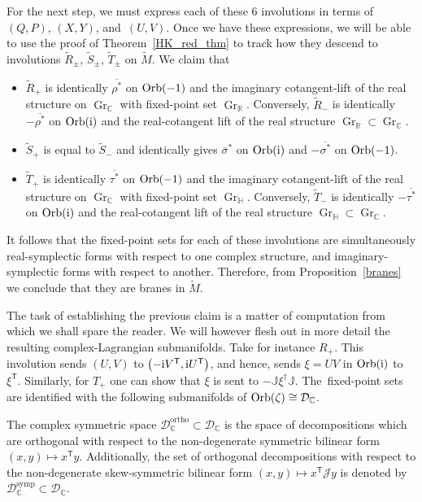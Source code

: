 \documentclass[pdftex]{sigma}
\numberwithin{equation}{section}
\DeclareMathOperator{\Gr}{Gr}
\newcommand{\R}{\mathbb{R}}
\newcommand{\C}{\mathbb{C}}
\newcommand{\D}{\mathcal{D}}
\newcommand{\Q}{\mathbb{H}}
\begin{document}
For the next step, we must express each of these 6 involutions in terms of $(Q,P)$, $(X,Y)$, and~$(U,V)$. Once we have these expressions, we will be able to use the proof of Theorem~\ref{HK_red_thm} to track how they descend to involutions $\widetilde{R}_\pm$, $\widetilde{S}_\pm$, $\widetilde{T}_\pm$ on $\tilde{M}$. We claim that
\begin{itemize}\itemsep=0pt
	\item $\widetilde{R}_+$ is identically $\overline{\rho^*}$ on ${\rm Orb}(-1)$ and the imaginary cotangent-lift of the real structure on $\Gr_\C$ with fixed-point set $\Gr_\R$. Conversely, $\widetilde{R}_-$ is identically $-\overline{\rho^*}$ on ${\rm Orb}({\rm i})$ and the real-cotangent lift of the real structure $\Gr_\R\subset\Gr_\C$.
	\item $\widetilde{S}_+$ is equal to $\widetilde{S}_-$ and identically gives $\overline{\sigma}^*$ on ${\rm Orb}({\rm i})$ and $-\overline{\sigma^*}$ on ${\rm Orb}(-1)$.
	\item $\widetilde{T}_+$ is identically $\overline{\tau^*}$ on ${\rm Orb}(-1)$ and the imaginary cotangent-lift of the real structure on $\Gr_\C$ with fixed-point set $\Gr_\Q$. Conversely, $\widetilde{T}_-$ is identically $-\overline{\tau^*}$ on ${\rm Orb}({\rm i})$ and the real-cotangent lift of the real structure $\Gr_\Q\subset\Gr_\C$.
\end{itemize}
It follows that the fixed-point sets for each of these involutions are simultaneously real-symplectic forms with respect to one complex structure, and imaginary-symplectic forms with respect to another. Therefore, from Proposition~\ref{branes} we conclude that they are branes in $\tilde{M}$.

The task of establishing the previous claim is a matter of computation from which we shall spare the reader. We will however flesh out in more detail the resulting complex-Lagrangian submanifolds. Take for instance $R_+$. This involution sends $(U,V)$ to $\bigl(-{\rm i}V^{\mathsf{T}},{\rm i}U^{\mathsf{T}}\bigr)$, and hence, sends $\xi=UV$ in ${\rm Orb}({\rm i})$ to $\xi^{\mathsf{T}}$. Similarly, for $T_+$ one can show that $\xi$ is sent to $-\mathbb{J}\xi^\dagger\mathbb{J}$. The~fixed-point sets are identified with the following submanifolds of ${\rm Orb}(\zeta)\cong\D_\C$.

\begin{Definition}
	The complex symmetric space $\D_\C^\text{ortho}\subset\D_\C$ is the space of decompositions which are orthogonal with respect to the non-degenerate symmetric bilinear form $(x,y)\mapsto x^{\mathsf{T}}y$. Additionally, the set of orthogonal decompositions with respect to the non-degenerate skew-symmetric bilinear form $(x,y)\mapsto x^{\mathsf{T}}\mathcal{J}y$ is denoted by $\D_\C^\text{symp}\subset\D_\C$.
\end{Definition}
\end{document}
